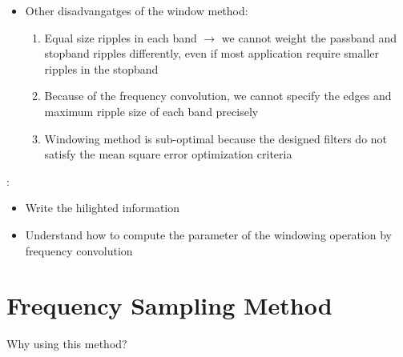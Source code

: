 \documentclass[12pt,a4paper]{book}
\begin{document}
\begin{itemize}
    \begin{itemize}
        \item To use other methods different then rectangular to reduce sidelobes effect at the expense of a wider main lobe (wider transition bandwidth)
    \end{itemize}

\item Other disadvangatges of the window method:

    \begin{enumerate}
        \item Equal size ripples in each band $\rightarrow$ we cannot weight the passband and stopband ripples differently, even if most application require smaller ripples in the stopband
        
        \item Because of the frequency convolution, we cannot specify the edges and maximum ripple size of each band precisely
        
        \item Windowing method is sub-optimal because the designed filters do not satisfy the mean square error optimization criteria
        
    \end{enumerate}



\end{itemize}


:\\

\begin{itemize}
    \item Write the hilighted information
    
    
    \item Understand how to compute the parameter of the windowing operation by frequency convolution
\end{itemize}

\section{Frequency Sampling Method}

Why using this method?
\end{document}
